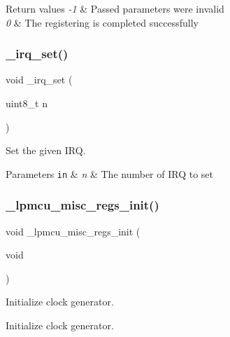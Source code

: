 \begin{DoxyRetVals}{Return values}
{\em -\/1} & Passed parameters were invalid \\
\hline
{\em 0} & The registering is completed successfully \\
\hline
\end{DoxyRetVals}
\mbox{\label{group___h_p_l_ga7720726f19dfdda1561a042483c97a58}} 
\subsubsection{\texorpdfstring{\+\_\+irq\+\_\+set()}{\_irq\_set()}}
{\footnotesize\ttfamily void \+\_\+irq\+\_\+set (\begin{DoxyParamCaption}\item[{uint8\+\_\+t}]{n }\end{DoxyParamCaption})}



Set the given I\+RQ. 


\begin{DoxyParams}[1]{Parameters}
\mbox{\tt in}  & {\em n} & The number of I\+RQ to set \\
\hline
\end{DoxyParams}
\mbox{\label{group___h_p_l_ga3dd85007c9fdeed2ffe1166a33dd6519}} 
\subsubsection{\texorpdfstring{\+\_\+lpmcu\+\_\+misc\+\_\+regs\+\_\+init()}{\_lpmcu\_misc\_regs\_init()}}
{\footnotesize\ttfamily void \+\_\+lpmcu\+\_\+misc\+\_\+regs\+\_\+init (\begin{DoxyParamCaption}\item[{void}]{ }\end{DoxyParamCaption})}



Initialize clock generator. 

Initialize clock generator. \mbox{\label{group___h_p_l_ga840b5c5290dd94e858db4d89259ba3f4}} 
